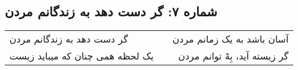 \begin{center}
\section*{شماره ۷: گر دست دهد به زندگانم مردن}
\label{sec:007}
\begin{longtable}{l p{0.5cm} r}
گر دست دهد به زندگانم مردن
&&
آسان باشد به یک زمانم مردن
\\
یک لحظه همی چنان که میباید زیست
&&
گر زیسته آید، بِهْ توانم مردن
\\
\end{longtable}
\end{center}
